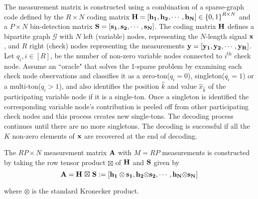 \documentclass[conference]{IEEEtran}
\begin{document}
The measurement matrix is constructed using a combination of a sparse-graph code defined by the $R \times N$ coding matrix ${\bf H=[h_1, h_2, \cdots ,h_{N}]} \in {\{0,1 \}}^{R \times N}$  and a $P \times N$ bin-detection matrix $\bf S=[s_1, s_2, \cdots ,s_N]$. The coding matrix $\bf H$ defines a bipartite graph $\mathcal{G}$ with $N$ left (variable) nodes, representing the $N$-length signal $\bf x$, and $R$ right (check) nodes representing the measurements  $\bf y=[y_1, y_2, \cdots, y_R]$. Let $q_i, i\in [R]$, be the number of non-zero variable nodes connected to $i^{\text{th}}$ check node. Assume an ``oracle" that solves the 1-sparse problem by examining each check node observations and classifies it as a zero-ton($q_i=0$), singleton($q_i=1$) or a multi-ton($q_i>1$), and also identifies the position $\hat{k}$ and value $\widehat{x}_{\hat{k}}$ of the participating variable node if it is a single-ton. Once a singleton is identified the corresponding variable node's contribution is peeled off from other participating check nodes and this process creates new single-tons. The decoding process continues until there are no more singletons. The decoding is successful if all the $K$ non-zero elements of $\bf x$ are recovered at the end of decoding.

The  $RP \times N $ measurement matrix $\bf A$ with $M = RP$ measurements is constructed by taking the row tensor product $ \boxtimes$ of $\bf H$ and $\bf S$ given by
\[
 \bf A = H \ { \boxtimes} \ S := [h_1 \otimes s_1, h_2 { \otimes} s_2, \cdots , h_N { \otimes} s_N]
 \]

where $\otimes$ is the standard Kronecker product.
\end{document}
